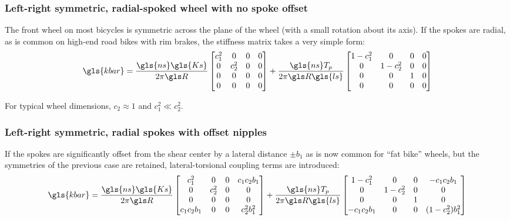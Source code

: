 \documentclass[\rootdir/thesis.tex]{subfiles}
\begin{document}
\subsubsection*{Left-right symmetric, radial-spoked wheel with no spoke offset}
The front wheel on most bicycles is symmetric across the plane of the wheel (with a small rotation about its axis). If the spokes are radial, as is common on high-end road bikes with rim brakes, the stiffness matrix takes a very simple form:
\begin{equation}
\label{eq:kbar_symm_radial}
\gls{kbar} = \frac{\gls{ns} \gls{Ks}}{2\pi \R}
\begin{bmatrix}
c_1^2     & 0 & 0 & 0\\
0 & c_2^2 & 0 & 0\\
0 & 0     & 0 & 0\\
0 & 0     & 0 & 0
\end{bmatrix} +
\frac{\gls{ns} T_p}{2\pi \R \gls{ls}}
\begin{bmatrix}
1-c_1^2 & 0       & 0 & 0\\
0       & 1-c_2^2 & 0 & 0\\
0       & 0       & 1 & 0\\
0       & 0       & 0 & 0
\end{bmatrix}
\end{equation}

For typical wheel dimensions, $c_2 \approx 1$ and $c_1^2 \ll c_2^2$.

\subsubsection*{Left-right symmetric, radial spokes with offset nipples}

If the spokes are significantly offset from the shear center by a lateral distance $\pm b_1$ as is now common for ``fat bike'' wheels, but the symmetries of the previous case are retained, lateral-torsional coupling terms are introduced:
\begin{equation}
\label{eq:kbar_symm_offset}
\gls{kbar} = \frac{\gls{ns} \gls{Ks}}{2\pi \R}
\begin{bmatrix}
c_1^2     & 0 & 0 & c_1c_2 b_1\\
0 & c_2^2 & 0 & 0\\
0 & 0     & 0 & 0\\
c_1c_2b_1 & 0     & 0 & c_2^2b_1^2
\end{bmatrix} +
\frac{\gls{ns} T_p}{2\pi \R \gls{ls}}
\begin{bmatrix}
1-c_1^2    & 0       & 0 & -c_1c_2b_1\\
0          & 1-c_2^2 & 0 & 0\\
0          & 0       & 1 & 0\\
-c_1c_2b_1 & 0       & 0 & (1-c_2^2)b_1^2
\end{bmatrix}
\end{equation}
\end{document}
